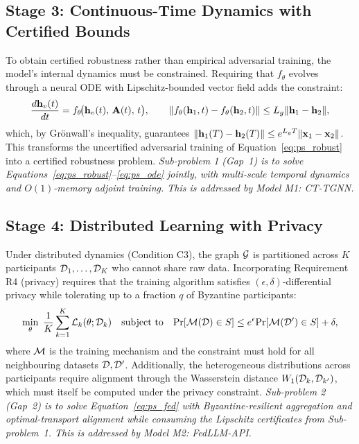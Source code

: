 \subsection{Stage 3: Continuous-Time Dynamics with Certified Bounds}

To obtain certified robustness rather than empirical adversarial training, the model's internal dynamics must be constrained. Requiring that $f_\theta$ evolves through a neural ODE with Lipschitz-bounded vector field adds the constraint:
\begin{equation}
\frac{d\mathbf{h}_v(t)}{dt} = f_\theta\!\bigl(\mathbf{h}_v(t),\,\mathbf{A}(t),\,t\bigr),
\qquad
\|f_\theta(\mathbf{h}_1,t)-f_\theta(\mathbf{h}_2,t)\| \le L_g\|\mathbf{h}_1-\mathbf{h}_2\|,
\label{eq:ps_ode}
\end{equation}
which, by Gr\"{o}nwall's inequality, guarantees $\|\mathbf{h}_1(T)-\mathbf{h}_2(T)\|\le e^{L_gT}\|\mathbf{x}_1-\mathbf{x}_2\|$. This transforms the uncertified adversarial training of Equation~\eqref{eq:ps_robust} into a certified robustness problem. \emph{Sub-problem 1 (Gap~1) is to solve Equations~\eqref{eq:ps_robust}--\eqref{eq:ps_ode} jointly, with multi-scale temporal dynamics and $O(1)$-memory adjoint training. This is addressed by Model M1: CT-TGNN.}

\subsection{Stage 4: Distributed Learning with Privacy}

Under distributed dynamics (Condition C3), the graph $\mathcal{G}$ is partitioned across $K$ participants $\mathcal{D}_1,\ldots,\mathcal{D}_K$ who cannot share raw data. Incorporating Requirement R4 (privacy) requires that the training algorithm satisfies $(\epsilon,\delta)$-differential privacy while tolerating up to a fraction $q$ of Byzantine participants:
\begin{equation}
\min_\theta\;
\frac{1}{K}\sum_{k=1}^{K}\mathcal{L}_k(\theta;\mathcal{D}_k)
\quad\text{subject to}\quad
\mathrm{Pr}[\mathcal{M}(\mathcal{D})\in S] \le e^{\epsilon}\mathrm{Pr}[\mathcal{M}(\mathcal{D}')\in S]+\delta,
\label{eq:ps_fed}
\end{equation}
where $\mathcal{M}$ is the training mechanism and the constraint must hold for all neighbouring datasets $\mathcal{D},\mathcal{D}'$. Additionally, the heterogeneous distributions across participants require alignment through the Wasserstein distance $W_1(\mathcal{D}_k,\mathcal{D}_{k'})$, which must itself be computed under the privacy constraint. \emph{Sub-problem 2 (Gap~2) is to solve Equation~\eqref{eq:ps_fed} with Byzantine-resilient aggregation and optimal-transport alignment while consuming the Lipschitz certificates from Sub-problem~1. This is addressed by Model M2: FedLLM-API.}


